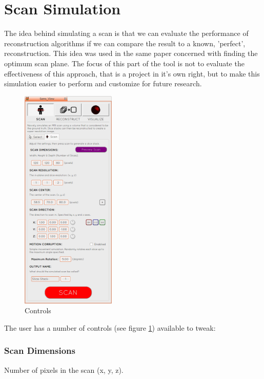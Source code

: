 \section{Scan Simulation}\label{implementation:simulatescan}
The idea behind simulating a scan is that we can evaluate the performance of reconstruction algorithms if we can compare the result to a known, 'perfect', reconstruction. This idea was used in the same paper concerned with finding the optimum scan plane\cite{uncertaintysvd}. The focus of this part of the tool is not to evaluate the effectiveness of this approach, that is a project in it's own right, but to make this simulation easier to perform and customize for future research.

\begin{figure}
  \vspace{-20pt}
  \includegraphics[width=0.4\textwidth]{images/scan_simulation/scan_settings.png}
  \caption{Controls}\label{fig:scansettings}
\end{figure}

The user has a number of controls (see figure \ref{fig:scansettings}) available to tweak:

\subsubsection*{Scan Dimensions}
Number of pixels in the scan (x, y, z).


